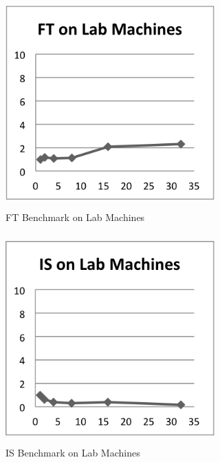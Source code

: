 \documentclass{acm_proc_article-sp}
\begin{document}
\begin{figure}[tbp]
  \centering
  \caption{FT Benchmark on Lab Machines}
	\label{LabFT}
  \includegraphics[width=19pc, height=19pc]{Pics-Lab/FT.png}
\end{figure}

\begin{figure}[tbp]
  \centering
  \caption{IS Benchmark on Lab Machines}
	\label{LabIS}
  \includegraphics[width=19pc, height=19pc]{Pics-Lab/IS.png}
\end{figure}
\end{document}
